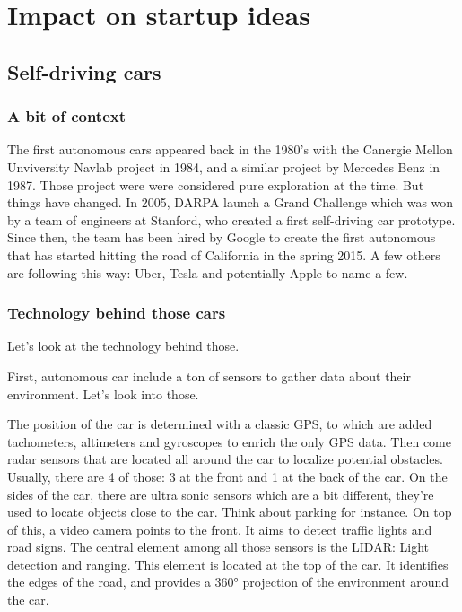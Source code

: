 \documentclass[11pt]{article}
\begin{document}
\section{Impact on startup ideas}

\subsection{Self-driving cars}

\subsubsection{A bit of context}

The first autonomous cars appeared back in the 1980's with the Canergie Mellon Unviversity Navlab project in 1984, and a similar project by Mercedes Benz in 1987. Those project were were considered pure exploration at the time. But things have changed. In 2005, DARPA launch a Grand Challenge which was won by a team of engineers at Stanford, who created a first self-driving car prototype. Since then, the team has been hired by Google to create the first autonomous that has started hitting the road of California in the spring 2015. 
A few others are following this way: Uber, Tesla and potentially Apple to name a few.

\subsubsection{Technology behind those cars}

Let's look at the technology behind those. 

First, autonomous car include a ton of sensors to gather data about their environment. Let's look into those. 

The position of the car is determined with a classic GPS, to which are added tachometers, altimeters and gyroscopes to enrich the only GPS data. 
Then come radar sensors that are located all around the car to localize potential obstacles. Usually, there are 4 of those: 3 at the front and 1 at the back of the car. On the sides of the car, there are ultra sonic sensors which are a bit different, they're used to locate objects close to the car. Think about parking for instance. 
On top of this, a video camera points to the front. It aims to detect traffic lights and road signs. 
The central element among all those sensors is the LIDAR: Light detection and ranging. This element is located at the top of the car. It identifies the edges of the road, and provides a 360° projection of the environment around the car. 
\end{document}
